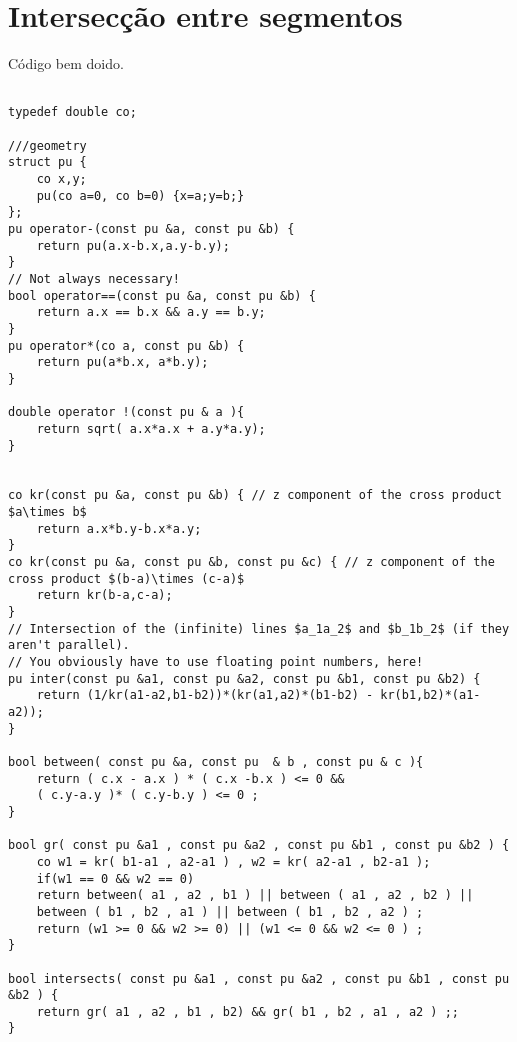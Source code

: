 \section{Intersecção entre segmentos}

Código bem doido.
\begin{multicols}{2}
	\begin{lstlisting}

typedef double co;

///geometry
struct pu {
	co x,y;
	pu(co a=0, co b=0) {x=a;y=b;}
};
pu operator-(const pu &a, const pu &b) {
	return pu(a.x-b.x,a.y-b.y);
}
// Not always necessary!
bool operator==(const pu &a, const pu &b) {
	return a.x == b.x && a.y == b.y;
}
pu operator*(co a, const pu &b) {
	return pu(a*b.x, a*b.y);
}

double operator !(const pu & a ){
	return sqrt( a.x*a.x + a.y*a.y);
}


co kr(const pu &a, const pu &b) { // z component of the cross product $a\times b$
	return a.x*b.y-b.x*a.y;
}
co kr(const pu &a, const pu &b, const pu &c) { // z component of the cross product $(b-a)\times (c-a)$
	return kr(b-a,c-a);
}
// Intersection of the (infinite) lines $a_1a_2$ and $b_1b_2$ (if they aren't parallel).
// You obviously have to use floating point numbers, here!
pu inter(const pu &a1, const pu &a2, const pu &b1, const pu &b2) {
	return (1/kr(a1-a2,b1-b2))*(kr(a1,a2)*(b1-b2) - kr(b1,b2)*(a1-a2));
}

bool between( const pu &a, const pu  & b , const pu & c ){
	return ( c.x - a.x ) * ( c.x -b.x ) <= 0 &&
	( c.y-a.y )* ( c.y-b.y ) <= 0 ;
}

bool gr( const pu &a1 , const pu &a2 , const pu &b1 , const pu &b2 ) {
	co w1 = kr( b1-a1 , a2-a1 ) , w2 = kr( a2-a1 , b2-a1 );
	if(w1 == 0 && w2 == 0)
	return between( a1 , a2 , b1 ) || between ( a1 , a2 , b2 ) ||
	between ( b1 , b2 , a1 ) || between ( b1 , b2 , a2 ) ;
	return (w1 >= 0 && w2 >= 0) || (w1 <= 0 && w2 <= 0 ) ;
}

bool intersects( const pu &a1 , const pu &a2 , const pu &b1 , const pu &b2 ) {
	return gr( a1 , a2 , b1 , b2) && gr( b1 , b2 , a1 , a2 ) ;; 
}

	\end{lstlisting}
\end{multicols}

